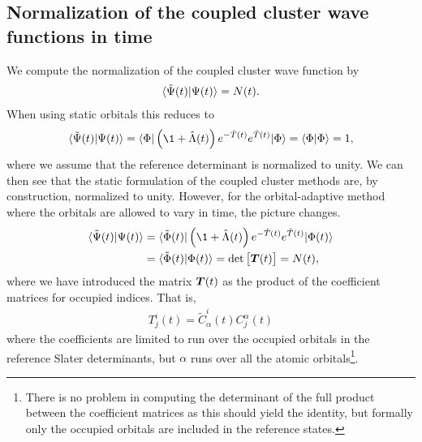         \subsection{Normalization of the coupled cluster wave functions in time}
            We compute the normalization of the coupled cluster wave function by
            \begin{align}
                \langle \tilde{\Psi}(t) | \Psi(t) \rangle = N(t).
            \end{align}
            When using static orbitals this reduces to
            \begin{align}
                \braket{\tilde{\Psi}(t)}{\Psi(t)}
                = \bra{\slat}\para{
                    \1 + \clustl(t)
                } e^{-\clust(t)}
                e^{\clust(t)}
                \ket{\slat}
                = \braket{\slat}{\slat}
                = 1,
            \end{align}
            where we assume that the reference determinant is normalized to
            unity.
            We can then see that the static formulation of the coupled cluster
            methods are, by construction, normalized to unity.
            However, for the orbital-adaptive method where the orbitals are
            allowed to vary in time, the picture changes.
            \begin{align}
                \braket{\tilde{\Psi}(t)}{\Psi(t)}
                &=
                \bra{\tilde{\Phi}(t)}
                \para{
                    \1 + \clustl(t)
                }
                e^{-\clust(t)}
                e^{\clust(t)}
                \ket{\slat(t)}
                \\
                &= \braket{\tilde{\Phi}(t)}{\Phi(t)}
                = \det\brak{\vfg{T}(t)}
                = N(t),
                \label{eq:norm-oatdcc}
            \end{align}
            where we have introduced the matrix $\boldsymbol{T}(t)$ as the product of
            the coefficient matrices for occupied indices.
            That is,
            \begin{align}
                T^{i}_{j}(t) = \tilde{C}^{i}_{\alpha}(t) C^{\alpha}_j(t)
            \end{align}
            where the coefficients are limited to run over the occupied orbitals
            in the reference Slater determinants, but $\alpha$ runs over all the
            atomic orbitals\footnote{%
                There is no problem in computing the determinant of the full
                product between the coefficient matrices as this should yield
                the identity, but formally only the occupied orbitals are
                included in the reference states.
            }.
